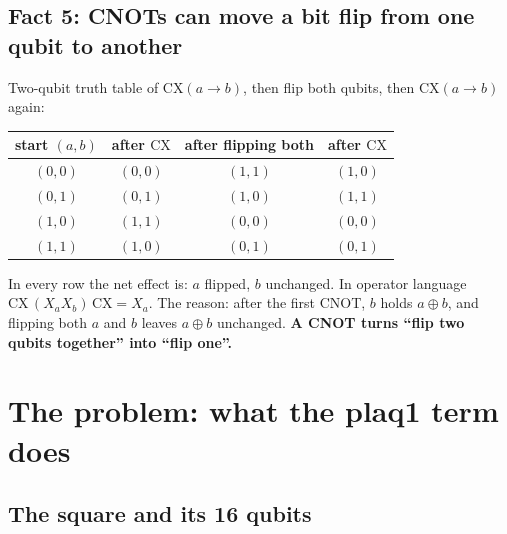 \documentclass[11pt]{article}
\newcommand{\CX}{\mathrm{CX}}
\begin{document}
\subsection{Fact 5: CNOTs can move a bit flip from one qubit to another}

Two-qubit truth table of $\CX(a\to b)$, then flip both qubits, then $\CX(a\to b)$ again:
\begin{center}
\begin{tabular}{c c c c}
\toprule
start $(a,b)$ & after $\CX$ & after flipping both & after $\CX$\\
\midrule
$(0,0)$ & $(0,0)$ & $(1,1)$ & $(1,0)$\\
$(0,1)$ & $(0,1)$ & $(1,0)$ & $(1,1)$\\
$(1,0)$ & $(1,1)$ & $(0,0)$ & $(0,0)$\\
$(1,1)$ & $(1,0)$ & $(0,1)$ & $(0,1)$\\
\bottomrule
\end{tabular}
\end{center}
In every row the net effect is: $a$ flipped, $b$ unchanged.  In operator language
$\CX\,(X_a X_b)\,\CX = X_a$.  The reason: after the first CNOT, $b$ holds $a\oplus b$, and flipping both $a$
and $b$ leaves $a\oplus b$ unchanged.  \textbf{A CNOT turns ``flip two qubits together'' into ``flip one''.}

\section{The problem: what the plaq1 term does}\label{sec:problem}

\subsection{The square and its 16 qubits}
\end{document}
